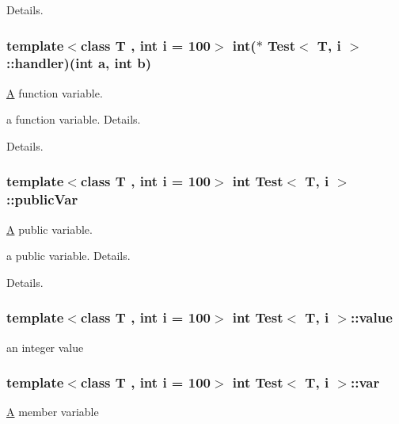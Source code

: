 Details. \hypertarget{classTest_a2ce50e60d16f5071772c6acde08181bd}{
\subsubsection[{handler}]{\setlength{\rightskip}{0pt plus 5cm}template$<$class T , int i = 100$>$ int($\ast$ {\bf Test}$<$ T, i $>$\-::handler)(int a, int b)}}\label{classTest_a2ce50e60d16f5071772c6acde08181bd}


\hyperlink{classA}{A} function variable. 

a function variable. Details.

Details. \hypertarget{classTest_aba22fd8dcb6ca747e2266fadaf5bc383}{
\subsubsection[{public\-Var}]{\setlength{\rightskip}{0pt plus 5cm}template$<$class T , int i = 100$>$ int {\bf Test}$<$ T, i $>$\-::public\-Var}}\label{classTest_aba22fd8dcb6ca747e2266fadaf5bc383}


\hyperlink{classA}{A} public variable. 

a public variable. Details.

Details. \hypertarget{classTest_aefcbb7ead19f2c28a71a3a3f26cef6cb}{
\subsubsection[{value}]{\setlength{\rightskip}{0pt plus 5cm}template$<$class T , int i = 100$>$ int {\bf Test}$<$ T, i $>$\-::value\hspace{0.3cm}{\ttfamily [protected]}}}\label{classTest_aefcbb7ead19f2c28a71a3a3f26cef6cb}
an integer value \hypertarget{classTest_ae75d55c8cf6390227d51c0965a4de296}{
\subsubsection[{var}]{\setlength{\rightskip}{0pt plus 5cm}template$<$class T , int i = 100$>$ int {\bf Test}$<$ T, i $>$\-::var\hspace{0.3cm}{\ttfamily [protected]}}}\label{classTest_ae75d55c8cf6390227d51c0965a4de296}
\hyperlink{classA}{A} member variable 

